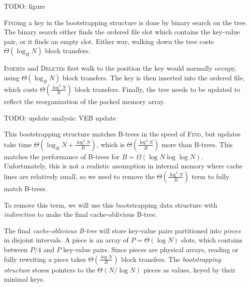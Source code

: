 TODO: figure

\textsc{Find}ing a key in the bootstrapping structure is done by binary search
on the tree. The binary search either finds the ordered file slot which contains
the key-value pair, or it finds an empty slot. Either way, walking down
the tree costs $\Theta(\log_B N)$ block transfers.

\textsc{Insert}s and \textsc{Delete}s first walk to the position the key
would normally occupy, using $\Theta(\log_B N)$ block transfers. The key
is then inserted into the ordered file, which costs
$\Theta(\frac{\log^2 N}{B})$ block transfers. Finally, the tree needs to be
updated to reflect the reorganization of the packed memory array.

TODO: update analysis: VEB update

This bootstrapping structure matches B-trees in the speed of \textsc{Find},
but updates take time $\Theta(\log_B N+\frac{\log^2 N}{B})$, which is
$\Theta(\frac{\log^2 N}{B})$ more than B-trees.
This matches the performance of B-trees for $B=\Omega(\log N\log\log N)$.
Unfortunately, this is not a realistic assumption in internal memory
where cache lines are relatively small, so we need to remove the
$\Theta(\frac{\log^2 N}{B})$ term to fully match B-trees.

To remove this term, we will use this bootstrapping data structure with
\emph{indirection} to make the final cache-oblivious B-tree.

The final \emph{cache-oblivious B-tree} will store key-value pairs
partitioned into \emph{pieces} in disjoint intervals. A piece is an array of
$P=\Theta(\log N)$ slots, which contains between $P/4$ and $P$ key-value pairs.
Since pieces are physical arrays, reading or fully rewriting a piece
takes $\Theta(\frac{\log N}{B})$ block transfers.
The \emph{bootstrapping structure} stores pointers to the $\Theta(N/\log N)$
pieces as values, keyed by their minimal keys.

